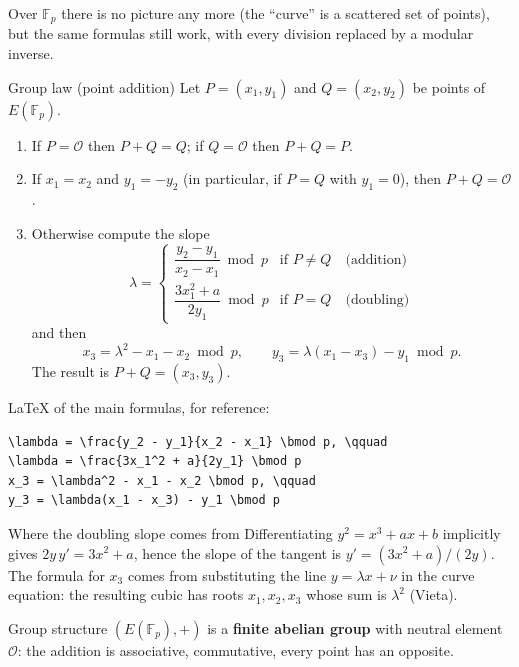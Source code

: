 Over $\mathbb{F}_p$ there is no picture any more (the ``curve'' is a scattered set of points), but the same formulas still work, with every division replaced by a modular inverse.

\begin{framedprop}[label={prop:grouplaw}]{Group law (point addition)}
  Let $P = (x_1, y_1)$ and $Q = (x_2, y_2)$ be points of $E(\mathbb{F}_p)$.
  \begin{enumerate}
    \item If $P = \mathcal{O}$ then $P + Q = Q$; if $Q = \mathcal{O}$ then $P + Q = P$.
    \item If $x_1 = x_2$ and $y_1 = -y_2$ (in particular, if $P = Q$ with $y_1 = 0$), then $P + Q = \mathcal{O}$.
    \item Otherwise compute the slope
    \[
      \lambda =
      \begin{cases}
        \dfrac{y_2 - y_1}{x_2 - x_1} \bmod p & \text{if } P \neq Q \quad \text{(addition)}\\[2ex]
        \dfrac{3x_1^2 + a}{2 y_1} \bmod p & \text{if } P = Q \quad \text{(doubling)}
      \end{cases}
    \]
    and then
    \[
      x_3 = \lambda^2 - x_1 - x_2 \bmod p, \qquad y_3 = \lambda (x_1 - x_3) - y_1 \bmod p .
    \]
    The result is $P + Q = (x_3, y_3)$.
  \end{enumerate}
\end{framedprop}

LaTeX of the main formulas, for reference:
\begin{lstlisting}[numbers=none]
\lambda = \frac{y_2 - y_1}{x_2 - x_1} \bmod p, \qquad
\lambda = \frac{3x_1^2 + a}{2y_1} \bmod p
x_3 = \lambda^2 - x_1 - x_2 \bmod p, \qquad
y_3 = \lambda(x_1 - x_3) - y_1 \bmod p\end{lstlisting}

\begin{framedobs}{Where the doubling slope comes from}
  Differentiating $y^2 = x^3 + ax + b$ implicitly gives $2y\, y' = 3x^2 + a$, hence the slope of the tangent is $y' = (3x^2 + a)/(2y)$. The formula for $x_3$ comes from substituting the line $y = \lambda x + \nu$ in the curve equation: the resulting cubic has roots $x_1, x_2, x_3$ whose sum is $\lambda^2$ (Vieta).
\end{framedobs}

\begin{framedthm}[label={thm:group}]{Group structure}
  $(E(\mathbb{F}_p), +)$ is a \textbf{finite abelian group} with neutral element $\mathcal{O}$: the addition is associative, commutative, every point has an opposite.
\end{framedthm}

